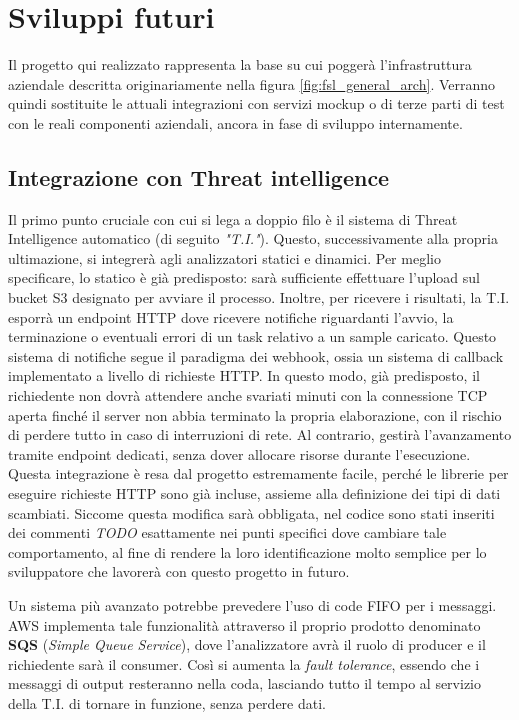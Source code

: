 \chapter{Sviluppi futuri}
Il progetto qui realizzato rappresenta la base su cui poggerà l'infrastruttura aziendale descritta originariamente nella figura \ref{fig:fsl_general_arch}.
Verranno quindi sostituite le attuali integrazioni con servizi mockup o di terze parti di test con le reali componenti aziendali, ancora in fase di sviluppo internamente.

\section{Integrazione con Threat intelligence}
Il primo punto cruciale con cui si lega a doppio filo è il sistema di Threat Intelligence automatico (di seguito \emph{"T.I."}). Questo, successivamente alla propria ultimazione, si integrerà agli analizzatori statici e dinamici.
Per meglio specificare, lo statico è già predisposto: sarà sufficiente effettuare l'upload sul bucket S3 designato per avviare il processo. Inoltre, per ricevere i risultati, la T.I. esporrà un endpoint HTTP dove ricevere notifiche riguardanti l'avvio, la terminazione o eventuali errori di un task relativo a un sample caricato.
Questo sistema di notifiche segue il paradigma dei webhook, ossia un sistema di callback implementato a livello di richieste HTTP. In questo modo, già predisposto, il richiedente non dovrà attendere anche svariati minuti con la connessione TCP aperta finché il server non abbia terminato la propria elaborazione, con il rischio di perdere tutto in caso di interruzioni di rete. Al contrario, gestirà l'avanzamento tramite endpoint dedicati, senza dover allocare risorse durante l'esecuzione.
Questa integrazione è resa dal progetto estremamente facile, perché le librerie per eseguire richieste HTTP sono già incluse, assieme alla definizione dei tipi di dati scambiati.
Siccome questa modifica sarà obbligata, nel codice sono stati inseriti dei commenti \emph{TODO} esattamente nei punti specifici dove cambiare tale comportamento, al fine di rendere la loro identificazione molto semplice per lo sviluppatore che lavorerà con questo progetto in futuro.

Un sistema più avanzato potrebbe prevedere l'uso di code FIFO per i messaggi. AWS implementa tale funzionalità attraverso il proprio prodotto denominato \textbf{SQS} (\emph{Simple Queue Service}), dove l'analizzatore avrà il ruolo di producer e il richiedente sarà il consumer. Così si aumenta la \emph{fault tolerance}, essendo che i messaggi di output resteranno nella coda, lasciando tutto il tempo al servizio della T.I. di tornare in funzione, senza perdere dati.

